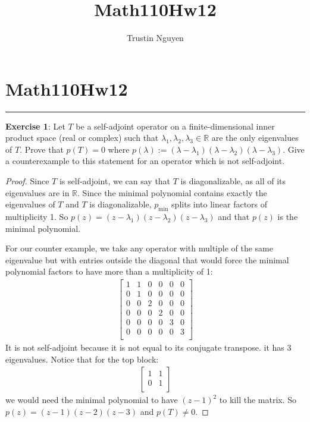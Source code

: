 \documentclass{article}
\title{Math110Hw12}
\author{Trustin Nguyen}
\begin{document}
\maketitle

\section*{Math110Hw12}
\hrule

\textbf{Exercise 1}: Let $T$ be a self-adjoint operator on a finite-dimensional inner product space (real or complex) such that $\lambda_{1}, \lambda_{2}, \lambda_{3} \in \mathbb{R}$ are the only eigenvalues of $T$. Prove that $p(T) = 0$ where $p(\lambda) := (\lambda - \lambda_{1})(\lambda - \lambda_{2})(\lambda - \lambda_{3})$. Give a counterexample to this statement for an operator which is not self-adjoint.

\begin{proof}
	Since $T$ is self-adjoint, we can say that $T$ is diagonalizable, as all of its eigenvalues are in $\mathbb{R}$. Since the minimal polynomial contains exactly the eigenvalues of $T$ and $T$ is diagonalizable, $p_{\text{min}}$ splits into linear factors of multiplicity 1. So $p(z) = (z - \lambda_{1})(z - \lambda_{2})(z - \lambda_{3})$ and that $p(z)$ is the minimal polynomial.

	For our counter example, we take any operator with multiple of the same eigenvalue but with entries outside the diagonal that would force the minimal polynomial factors to have more than a multiplicity of 1:
	\begin{align*}
		\begin{bmatrix}
		1 & 1 & 0 & 0 & 0 & 0 \\
		0 & 1 & 0 & 0 & 0 & 0 \\
		0 & 0 & 2 & 0 & 0 & 0 \\
		0 & 0 & 0 & 2 & 0 & 0 \\
		0 & 0 & 0 & 0 & 3 & 0 \\
		0 & 0 & 0 & 0 & 0 & 3 \\
		\end{bmatrix}
	\end{align*}
	It is not self-adjoint because it is not equal to its conjugate transpose. it has 3 eigenvalues. Notice that for the top block:
	\begin{align*}
		\begin{bmatrix}
		1 & 1 \\
		0 & 1 \\
		\end{bmatrix}
	\end{align*}
	we would need the minimal polynomial to have $(z - 1)^{2}$ to kill the matrix. So $p(z) = (z - 1)(z - 2)(z - 3)$ and $p(T) \neq 0$.
\end{proof}
\end{document}
